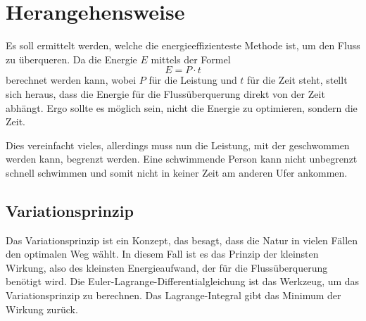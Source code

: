 %
%
%
%
\section{Herangehensweise\label{schwimmen:section:teil0}}

Es soll ermittelt werden, welche die energieeffizienteste Methode ist, um den Fluss zu überqueren. Da die Energie \(E\) mittels der Formel \[E = P \cdot t\] berechnet werden kann, wobei \(P\) für die Leistung und \(t\) für die Zeit steht, stellt sich heraus, dass die Energie für die Flussüberquerung direkt von der Zeit abhängt. Ergo sollte es möglich sein, nicht die Energie zu optimieren, sondern die Zeit.

Dies vereinfacht vieles, allerdings muss nun die Leistung, mit der geschwommen werden kann, begrenzt werden. Eine schwimmende Person kann nicht unbegrenzt schnell schwimmen und somit nicht in keiner Zeit am anderen Ufer ankommen.

\subsection{Variationsprinzip}
Das Variationsprinzip ist ein Konzept, das besagt, dass die Natur in vielen Fällen den optimalen Weg wählt. In diesem Fall ist es das Prinzip der kleinsten Wirkung, also des kleinsten Energieaufwand, der für die Flussüberquerung benötigt wird. Die Euler-Lagrange-Differentialgleichung ist das Werkzeug, um das Variationsprinzip zu berechnen. Das Lagrange-Integral gibt das Minimum der Wirkung zurück.













